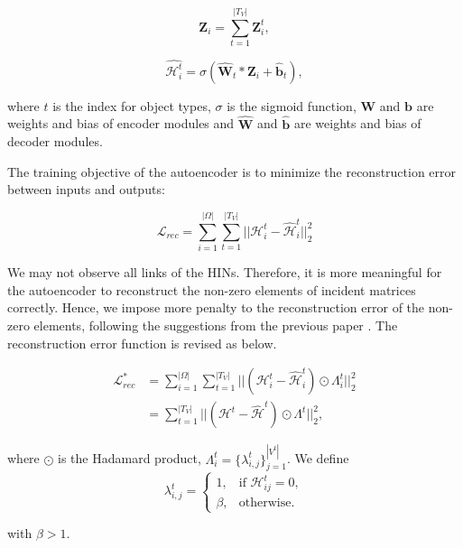 \begin{equation}\label{equation4}
\textbf{Z}_i = \sum_{t=1}^{|T_V|}\textbf{Z}_i^t,
\end{equation}

\begin{equation}\label{equation5}
\hat{\mathcal{H}_i^t} = \sigma(\hat{\textbf{W}}_t*\textbf{Z}_i + \hat{\textbf{b}}_t),
\end{equation}

\noindent where $t$ is the index for object types, $\sigma$ is the sigmoid function, $\textbf{W}$ and $\textbf{b}$ are weights and bias of encoder modules and $\hat{\textbf{W}}$ and $\hat{\textbf{b}}$ are weights and bias of decoder modules.

\smallskip
The training objective of the autoencoder is to minimize the reconstruction error between inputs and outputs:

\begin{equation}\label{equation6}
\mathcal{L}_{rec} = \sum_{i=1}^{|\Omega|}\sum_{t=1}^{|T_V|}{||\mathcal{H}_i^t-\hat{\mathcal{H}}_i^t||_2^2}
\end{equation}

We may not observe all links of the HINs. Therefore, it is more meaningful for the autoencoder to reconstruct the non-zero elements of incident matrices correctly. Hence, we impose more penalty to the reconstruction error of the non-zero elements, following the suggestions from the previous paper \cite{wang2016structural}. The reconstruction error function is revised as below.

\begin{equation}\label{equation7}
\begin{aligned}
\mathcal{L}_{rec}^* &= \sum_{i=1}^{|\Omega|}\sum_{t=1}^{|T_V|}{||(\mathcal{H}_i^t-\hat{\mathcal{H}}_i^t)\odot\Lambda_i^t||_2^2}\\
&=\sum_{t=1}^{|T_V|}{||(\mathcal{H}^t-\hat{\mathcal{H}}^t)\odot\Lambda^t||_2^2},
\end{aligned}
\end{equation}

\noindent where $\odot$ is the Hadamard product, $\Lambda_i^t = \{\lambda_{i,j}^t\}_{j=1}^{|V^t|}$. We define\\
\[ \lambda_{i,j}^t =
\begin{cases}
1, & \mbox{if } \mathcal{H}_{ij}^t = 0,\\
\beta, & \mbox{otherwise}.
\end{cases}
\]

\noindent with $\beta>1$.

